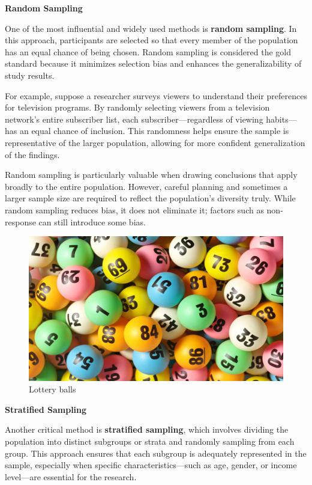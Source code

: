 \documentclass[
]{book}
\begin{document}
\textbf{Random Sampling}

One of the most influential and widely used methods is \textbf{random sampling}. In this approach, participants are selected so that every member of the population has an equal chance of being chosen. Random sampling is considered the gold standard because it minimizes selection bias and enhances the generalizability of study results.

For example, suppose a researcher surveys viewers to understand their preferences for television programs. By randomly selecting viewers from a television network's entire subscriber list, each subscriber---regardless of viewing habits---has an equal chance of inclusion. This randomness helps ensure the sample is representative of the larger population, allowing for more confident generalization of the findings.

Random sampling is particularly valuable when drawing conclusions that apply broadly to the entire population. However, careful planning and sometimes a larger sample size are required to reflect the population's diversity truly. While random sampling reduces bias, it does not eliminate it; factors such as non-response can still introduce some bias.

\begin{figure}
\centering
\includegraphics[width=1\textwidth,height=\textheight]{images/random.jpg}
\caption{Lottery balls}
\end{figure}

\textbf{Stratified Sampling}

Another critical method is \textbf{stratified sampling}, which involves dividing the population into distinct subgroups or strata and randomly sampling from each group. This approach ensures that each subgroup is adequately represented in the sample, especially when specific characteristics---such as age, gender, or income level---are essential for the research.
\end{document}
